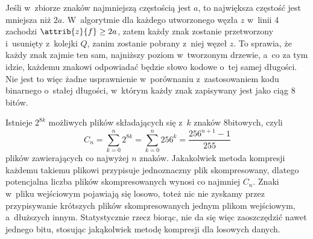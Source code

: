 \noindent Jeśli w~zbiorze znaków najmniejszą częstością jest $a$, to największa częstość jest mniejsza niż $2a$.
W~algorytmie  dla każdego utworzonego węzła $z$ w~linii 4 zachodzi $\attrib{z}{f}\ge2a$, zatem każdy znak zostanie przetworzony i~usunięty z~kolejki $Q$, zanim zostanie pobrany z~niej węzeł $z$.
To sprawia, że każdy znak zajmie ten sam, najniższy poziom w~tworzonym drzewie, a~co za tym idzie, każdemu znakowi odpowiadać będzie słowo kodowe o~tej samej długości.
Nie jest to więc żadne usprawnienie w~porównaniu z~zastosowaniem kodu binarnego o~stałej długości, w~którym każdy znak zapisywany jest jako ciąg 8 bitów.

\exercise %
Istnieje $2^{8k}$ możliwych plików składających się z~$k$ znaków 8\nbhyphen bitowych, czyli
\[
	C_n = \sum_{k=0}^n2^{8k} = \sum_{k=0}^n256^k = \frac{256^{n+1}-1}{255}
\]
plików zawierających co najwyżej $n$ znaków.
Jakakolwiek metoda kompresji każdemu takiemu plikowi przypisuje jednoznaczny plik skompresowany, dlatego potencjalna liczba plików skompresowanych wynosi co najmniej $C_n$.
Znaki w~pliku wejściowym pojawiają się losowo, toteż nic nie zyskamy przez przypisywanie krótszych plików skompresowanych jednym plikom wejściowym, a~dłuższych innym.
Statystycznie rzecz biorąc, nie da się więc zaoszczędzić nawet jednego bitu, stosując jakąkolwiek metodę kompresji dla losowych danych.
